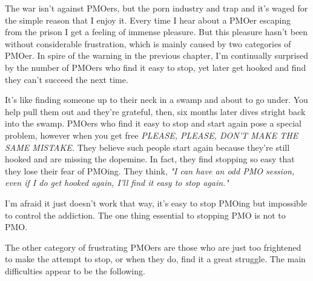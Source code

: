\documentclass[easypeasy.tex]{subfiles}
\begin{document}
The war isn't against PMOers, but the porn industry and trap and it's waged for the simple reason that I enjoy it. Every time I hear about a PMOer escaping from the prison I get a feeling of immense pleasure. But this pleasure hasn't been without considerable frustration, which is mainly caused by two categories of PMOer. In spire of the warning in the previous chapter, I'm continually surprised by the number of PMOers who find it easy to stop, yet later get hooked and find they can't succeed the next time.

It's like finding someone up to their neck in a swamp and about to go under. You help pull them out and they're grateful, then, six months later dives stright back into the swamp. PMOers who find it easy to stop and start again pose a special problem, however when you get free \textit{PLEASE, PLEASE, DON'T MAKE THE SAME MISTAKE.} They believe such people start again because they're still hooked and are missing the dopemine. In fact, they find stopping so easy that they lose their fear of PMOing. They think, \textit{"I can have an odd PMO session, even if I do get hooked again, I'll find it easy to stop again."}

I'm afraid it just doesn't work that way, it's easy to stop PMOing but impossible to control the addiction. The one thing essential to stopping PMO is not to PMO. 

The other category of frustrating PMOers are those who are just too frightened to make the attempt to stop, or when they do, find it a great struggle. The main difficulties appear to be the following.
\end{document}

